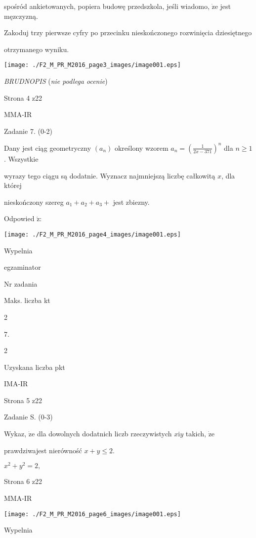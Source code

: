 \documentclass[a4paper,12pt]{article}
\begin{document}
spośród ankietowanych, popiera budowę przedszkola, jeśli wiadomo, $\dot{\mathrm{z}}\mathrm{e}$ jest męzczyzną.

Zakoduj trzy pierwsze cyfry po przecinku nieskończonego rozwinięcia dziesiętnego

otrzymanego wyniku.
\begin{center}
\texttt{[image: ./F2\_M\_PR\_M2016\_page3\_images/image001.eps]}
\end{center}
{\it BRUDNOPIS} ({\it nie podlega ocenie})

Strona 4 z22

MMA-IR





Zadanie 7. (0-2)

Dany jest ciąg geometryczny $(a_{n})$ określony wzorem $a_{n}=(\displaystyle \frac{1}{2x-371})^{n}$ dla $n\geq 1$. Wszystkie

wyrazy tego ciągu są dodatnie. Wyznacz najmniejszą liczbę całkowitą $x$, dla której

nieskończony szereg $a_{1}+a_{2}+a_{3}+$ jest zbiezny.

Odpowied $\acute{\mathrm{z}}$:
\begin{center}
\texttt{[image: ./F2\_M\_PR\_M2016\_page4\_images/image001.eps]}
\end{center}
Wypelnia

egzaminator

Nr zadania

Maks. liczba kt

2

7.

2

Uzyskana liczba pkt

IMA-IR

Strona 5 z22





Zadanie S. (0-3)

Wykaz, $\dot{\mathrm{z}}\mathrm{e}$ dla dowolnych dodatnich liczb rzeczywistych $x \mathrm{i} y$ takich, $\dot{\mathrm{z}}\mathrm{e}$

prawdziwajest nierówność $x+y\leq 2.$

$x^{2}+y^{2}=2,$

Strona 6 z22

MMA-IR




\begin{center}
\texttt{[image: ./F2\_M\_PR\_M2016\_page6\_images/image001.eps]}
\end{center}
Wypelnia
\end{document}
